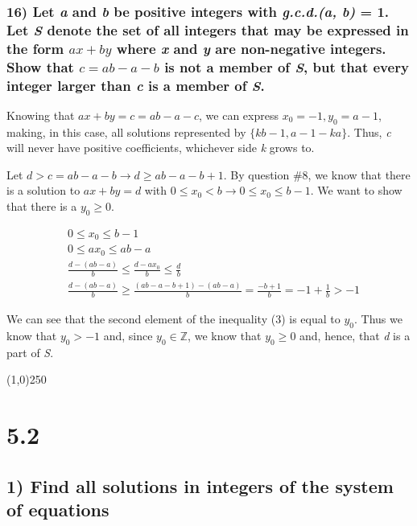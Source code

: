\documentclass[11pt]{article}
\begin{document}
\subsubsection*{16) Let \emph{a} and \emph{b} be positive integers with \emph{g.c.d.(a, b)} = 1. Let \emph{S} denote the set of all integers that may be expressed in the form \(ax + by\) where \emph{x} and \emph{y} are non-negative integers. Show that \(c = ab - a - b\) is not a member of \emph{S}, but that every integer larger than \emph{c} is a member of \emph{S}.}
\label{sec:org17d1b32}

Knowing that \(ax + by = c = ab - a - c\), we can express \(x_0 = -1, y_0 = a-1\), making, in this case, all solutions represented by \(\{kb - 1, a - 1 - ka\}\). Thus, \emph{c} will never have positive coefficients, whichever side \emph{k} grows to.

Let \(d > c = ab - a - b \to d \ge ab - a - b + 1\). By question \#8, we know that there is a solution to \(ax + by = d\) with \(0 \le x_0 < b \to 0 \le x_0 \le b - 1\). We want to show that there is a \(y_0 \ge 0\).

\setcounter{equation}{0}

\begin{eqnarray}
 &0 \le x_0 \le b-1 \\
 &0 \le ax_0 \le ab - a \\
 &\frac{d-(ab-a)}{b} \le \frac{d-ax_0}{b} \le \frac{d}{b} \\
 &\frac{d-(ab-a)}{b} \ge \frac{(ab - a - b + 1)-(ab-a)}{b} = \frac{-b+1}{b} = -1 + \frac{1}{b} > -1
\end{eqnarray}

We can see that the second element of the inequality (3) is equal to \(y_0\). Thus we know that \(y_0 > -1\) and, since \(y_0 \in \mathbb{Z}\), we know that \(y_0 \ge 0\) and, hence, that \emph{d} is a part of \emph{S}.


\begin{center}
\line(1,0){250}
\end{center}

\section*{5.2}
\label{sec:orgdeaae19}
\subsection*{1) Find all solutions in integers of the system of equations}
\label{sec:org150a93b}
\end{document}

